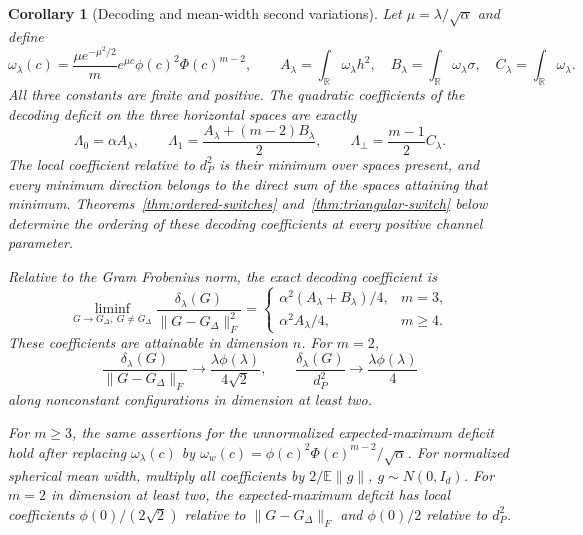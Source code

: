 \documentclass[11pt]{article}
\newtheorem{corollary}[theorem]{Corollary}
\theoremstyle{remark}\newtheorem{remark}[theorem]{Remark}
\newcommand{\R}{\mathbb R}
\newcommand{\E}{\mathbb E}
\begin{document}
\begin{corollary}[Decoding and mean-width second variations]\label{cor:spectrum-integrated}
Let $\mu=\lambda/\sqrt\alpha$ and define
\[
 \omega_\lambda(c)=\frac{\mu e^{-\mu^2/2}}m
 e^{\mu c}\phi(c)^2\Phi(c)^{m-2},\qquad
 A_\lambda=\int_\R\omega_\lambda h^2,\quad
 B_\lambda=\int_\R\omega_\lambda\sigma,\quad
 C_\lambda=\int_\R\omega_\lambda.
\]
All three constants are finite and positive.  The quadratic coefficients
of the decoding deficit on the three horizontal spaces are exactly
\[
 \Lambda_0=\alpha A_\lambda,\qquad
 \Lambda_1=\frac{A_\lambda+(m-2)B_\lambda}{2},\qquad
 \Lambda_\perp=\frac{m-1}{2}C_\lambda.
\]
The local coefficient relative to $d_P^2$ is their minimum over spaces
present, and every minimum direction belongs to the direct sum of the
spaces attaining that minimum.  Theorems~\ref{thm:ordered-switches} and~\ref{thm:triangular-switch}
below determine the ordering of these decoding coefficients at every positive
channel parameter.

Relative to the Gram Frobenius norm, the exact decoding coefficient is
\[
 \liminf_{G\to G_\Delta,\ G\ne G_\Delta}
 \frac{\delta_\lambda(G)}{\|G-G_\Delta\|_F^2}
 =\begin{cases}
 \alpha^2(A_\lambda+B_\lambda)/4,&m=3,\\
 \alpha^2 A_\lambda/4,&m\ge4.
 \end{cases}
\]
These coefficients are attainable in dimension $n$.  For $m=2$,
\[
 \frac{\delta_\lambda(G)}{\|G-G_\Delta\|_F}
 \longrightarrow\frac{\lambda\phi(\lambda)}{4\sqrt2},
 \qquad
 \frac{\delta_\lambda(G)}{d_P^2}
 \longrightarrow\frac{\lambda\phi(\lambda)}4
\]
along nonconstant configurations in dimension at least two.

For $m\ge3$, the same assertions for the unnormalized expected-maximum deficit hold
after replacing $\omega_\lambda(c)$ by
$\omega_w(c)=\phi(c)^2\Phi(c)^{m-2}/\sqrt\alpha$.
For normalized spherical mean width, multiply all coefficients by
$2/\E\|g\|$, $g\sim N(0,I_d)$.
For $m=2$ in dimension at least two, the expected-maximum deficit has
local coefficients $\phi(0)/(2\sqrt2)$ relative to
$\|G-G_\Delta\|_F$ and $\phi(0)/2$ relative to $d_P^2$.
\end{corollary}
\end{document}
